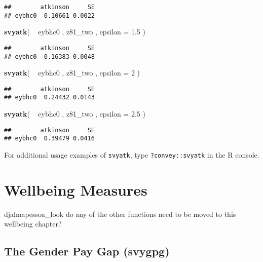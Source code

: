 \documentclass[]{book}
\newenvironment{Shaded}{\begin{snugshade}}{\end{snugshade}}
\newcommand{\KeywordTok}[1]{\textcolor[rgb]{0.13,0.29,0.53}{\textbf{{#1}}}}
\newcommand{\DataTypeTok}[1]{\textcolor[rgb]{0.13,0.29,0.53}{{#1}}}
\newcommand{\DecValTok}[1]{\textcolor[rgb]{0.00,0.00,0.81}{{#1}}}
\newcommand{\FloatTok}[1]{\textcolor[rgb]{0.00,0.00,0.81}{{#1}}}
\newcommand{\StringTok}[1]{\textcolor[rgb]{0.31,0.60,0.02}{{#1}}}
\newcommand{\NormalTok}[1]{{#1}}
\begin{document}
\begin{verbatim}
##        atkinson     SE
## eybhc0  0.10661 0.0022
\end{verbatim}

\begin{Shaded}
\begin{Highlighting}[]
\KeywordTok{svyatk}\NormalTok{( ~}\StringTok{ }\NormalTok{eybhc0 , z81_two , }\DataTypeTok{epsilon =} \FloatTok{1.5} \NormalTok{)}
\end{Highlighting}
\end{Shaded}

\begin{verbatim}
##        atkinson     SE
## eybhc0  0.16383 0.0048
\end{verbatim}

\begin{Shaded}
\begin{Highlighting}[]
\KeywordTok{svyatk}\NormalTok{( ~}\StringTok{ }\NormalTok{eybhc0 , z81_two , }\DataTypeTok{epsilon =} \DecValTok{2} \NormalTok{)}
\end{Highlighting}
\end{Shaded}

\begin{verbatim}
##        atkinson     SE
## eybhc0  0.24432 0.0143
\end{verbatim}

\begin{Shaded}
\begin{Highlighting}[]
\KeywordTok{svyatk}\NormalTok{( ~}\StringTok{ }\NormalTok{eybhc0 , z81_two , }\DataTypeTok{epsilon =} \FloatTok{2.5} \NormalTok{)}
\end{Highlighting}
\end{Shaded}

\begin{verbatim}
##        atkinson     SE
## eybhc0  0.39479 0.0416
\end{verbatim}

For additional usage examples of \texttt{svyatk}, type
\texttt{?convey::svyatk} in the R console.

\chapter{Wellbeing Measures}\label{wellbeing}

djalmapessoa\_look do any of the other functions need to be moved to
this wellbeing chapter?

\section{The Gender Pay Gap (svygpg)}\label{the-gender-pay-gap-svygpg}
\end{document}
